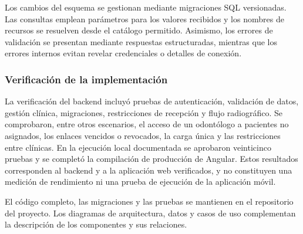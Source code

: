 Los cambios del esquema se gestionan mediante migraciones SQL versionadas.
Las consultas emplean parámetros para los valores recibidos y los nombres
de recursos se resuelven desde el catálogo permitido. Asimismo, los errores
de validación se presentan mediante respuestas estructuradas, mientras que
los errores internos evitan revelar credenciales o detalles de conexión.

\subsubsection{Verificación de la implementación}

La verificación del backend incluyó pruebas de autenticación, validación
de datos, gestión clínica, migraciones, restricciones de recepción y flujo
radiográfico. Se comprobaron, entre otros escenarios, el acceso de un
odontólogo a pacientes no asignados, los enlaces vencidos o revocados,
la carga única y las restricciones entre clínicas. En la ejecución local
documentada se aprobaron veinticinco pruebas y se completó la compilación
de producción de Angular. Estos resultados corresponden al backend y a la
aplicación web verificados, y no constituyen una medición de rendimiento
ni una prueba de ejecución de la aplicación móvil.

El código completo, las migraciones y las pruebas se mantienen en el
repositorio del proyecto. Los diagramas de arquitectura, datos y casos
de uso complementan la descripción de los componentes y sus relaciones.
